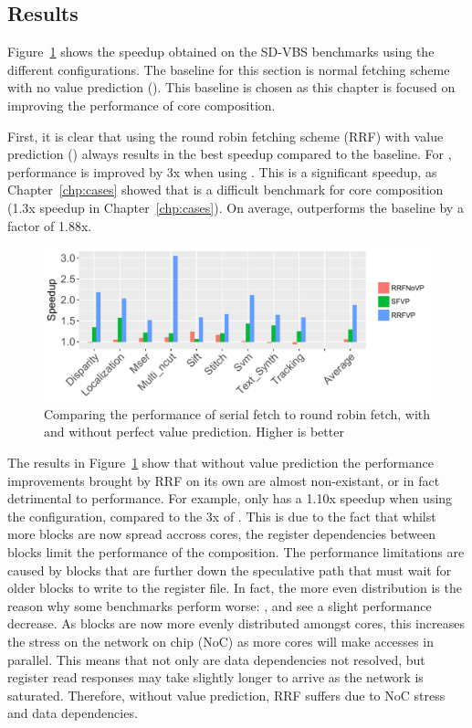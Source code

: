 \subsection{Results}
Figure~\ref{fig:perf_pred} shows the speedup obtained on the SD-VBS benchmarks using the different configurations.
The baseline for this section is normal fetching scheme with no value prediction (\novp).
This baseline is chosen as this chapter is focused on improving the performance of core composition.


First, it is clear that using the round robin fetching scheme (RRF) with value prediction (\nfvp) always results in the best speedup compared to the baseline.
For , performance is improved by 3x when using \nfvp.
This is a significant speedup, as Chapter~\ref{chp:cases} showed that  is a difficult benchmark for core composition (1.3x speedup in Chapter~\ref{chp:cases}).
On average, \nfvp{} outperforms the baseline by a factor of 1.88x.

\begin{figure}[t]
    \centering
    \includegraphics[width=1\textwidth]{chapter3/graphics/tempres4.pdf}
    \caption{Comparing the performance of serial fetch to round robin fetch, with and without perfect value prediction. Higher is better}
    \label{fig:perf_pred}
\end{figure}
The results in Figure~\ref{fig:perf_pred} show that without value prediction the performance improvements brought by RRF on its own are almost non-existant, or in fact detrimental to performance.
For example,  only has a 1.10x speedup when using the \nfnovp{} configuration, compared to the 3x of \nfvp{}.
This is due to the fact that whilst more blocks are now spread accross cores, the register dependencies between blocks limit the performance of the composition. 
The performance limitations are caused by blocks that are further down the speculative path that must wait for older blocks to write to the register file.
In fact, the more even distribution is the reason why some benchmarks perform worse: ,  and  see a slight performance decrease.
As blocks are now more evenly distributed amongst cores, this increases the stress on the network on chip (NoC) as more cores will make accesses in parallel.
This means that not only are data dependencies not resolved, but register read responses may take slightly longer to arrive as the network is saturated.
Therefore, without value prediction, RRF suffers due to NoC stress and data dependencies.


